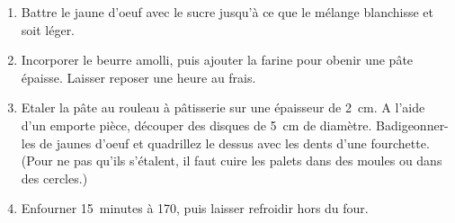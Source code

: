 
\begin{ingredients}
\end{ingredients}


\begin{recipe}
  \begin{enumerate}

  \item Battre le jaune d'oeuf avec le sucre jusqu'\`a ce que le
    m\'elange blanchisse et soit l\'eger.

  \item Incorporer le beurre amolli, puis ajouter la farine pour obenir
    une p\^ate \'epaisse.  Laisser reposer une heure au frais.

  \item Etaler la p\^ate au rouleau \`a p\^atisserie sur une
    \'epaisseur de 2~cm.  A l'aide d'un emporte pi\`ece, d\'ecouper
    des disques de 5~cm de diam\`etre.  Badigeonner-les de jaunes
    d'oeuf et quadrillez le dessus avec les dents d'une fourchette.
    (Pour ne pas qu'ils s'\'etalent, il faut cuire les palets dans des
    moules ou dans des cercles.)

  \item Enfourner 15~minutes \`a 170\C, puis laisser refroidir hors du
    four.

  \end{enumerate}
\end{recipe}
